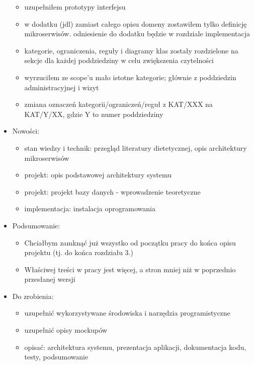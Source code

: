 \begin{itemize}
\begin{itemize}
	\item uzupełniłem prototypy interfejsu
	\item w dodatku (jdl) zamiast całego opisu domeny zostawiłem tylko definicję mikroserwisów. odniesienie do dodatku będzie w rozdziale implementacja
	\item kategorie, ograniczenia, reguły i diagramy klas zostały rozdzielone na sekcje dla każdej poddziedziny w celu zwiększenia czytelności
	\item wyrzuciłem ze scope'u mało istotne kategorie; głównie z poddziedzin administracyjnej i wizyt
	\item zmiana oznaczeń kategorii/ograniczeń/reguł z KAT/XXX na KAT/Y/XX, gdzie Y to numer poddziedziny
	\end{itemize}
\item Nowości:
    \begin{itemize}
	\item stan wiedzy i technik: przegląd literatury dietetycznej, opis architektury mikroserwisów
	\item projekt: opis podstawowej architektury systemu
	\item projekt: projekt bazy danych - wprowadzenie teoretyczne
	\item implementacja: instalacja oprogramowania
	\end{itemize}
\item Podsumowanie:
    \begin{itemize}
	\item Chciałbym zamknąć już wszystko od początku pracy do końca opisu projektu (tj. do końca rozdziału 3.)
	\item Właściwej treści w pracy jest więcej, a stron mniej niż w poprzednio przesłanej wersji
	\end{itemize}
\item Do zrobienia:
    \begin{itemize}
	\item uzupełnić wykorzystywane środowiska i narzędzia programistyczne
	\item uzupełnić opisy mockupów
	\item opisać: architektura systemu, prezentacja aplikacji, dokumentacja kodu, testy, podsumowanie
	\end{itemize}
\end{itemize}

\cleardoublepage
{}
